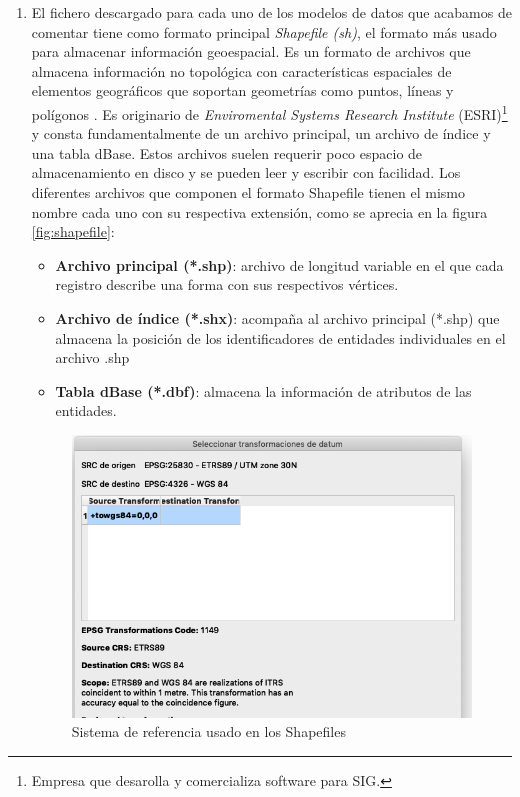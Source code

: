 \begin{enumerate}
	\item El fichero descargado para cada uno de los modelos de datos que acabamos de comentar tiene como formato principal \textit{Shapefile (sh)}, el formato más usado para almacenar información geoespacial. Es un formato de archivos que almacena información no topológica con características espaciales de elementos geográficos que soportan geometrías como puntos, líneas y polígonos \cite{tesis}.  Es originario de \textit{Enviromental Systems Research Institute} (ESRI)\footnote{Empresa que desarolla y comercializa software para SIG.} y consta fundamentalmente de un archivo principal, un archivo de índice y una tabla dBase. Estos archivos suelen requerir poco espacio de almacenamiento en disco y se pueden leer y escribir con facilidad. Los diferentes archivos que componen el formato Shapefile tienen el mismo nombre cada uno con su respectiva extensión, como se aprecia en la figura \ref{fig:shapefile}:
	


	\begin{itemize}
		\item \textbf{Archivo principal (*.shp)}: archivo de longitud variable en el que cada registro describe una forma con sus respectivos vértices. 
		
		\item \textbf{Archivo de índice (*.shx)}: acompaña al archivo principal (*.shp) que almacena la posición de los identificadores de entidades individuales en el archivo .shp 
		
		\item \textbf{Tabla dBase (*.dbf)}: almacena la información de atributos de las entidades. 
	\end{itemize}	

	\begin{figure}[H]
	\centering
	\includegraphics[width=0.6\linewidth]{imagenes/capitulo5/codificacion}
	\caption{Sistema de referencia usado en los Shapefiles}
	\label{fig:codificacion}
\end{figure}


\end{enumerate}
